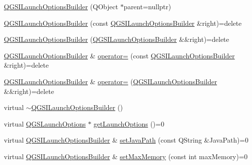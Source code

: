 \begin{DoxyCompactItemize}
\item 
\mbox{\hyperlink{class_q_g_s_i_launch_options_builder_a1f40a44ef9d9654919bdf27c4ec5d4b9}{Q\+G\+S\+I\+Launch\+Options\+Builder}} (Q\+Object $\ast$parent=nullptr)
\item 
\mbox{\hyperlink{class_q_g_s_i_launch_options_builder_a1fbedf7c9519946077a9aa386df72ea3}{Q\+G\+S\+I\+Launch\+Options\+Builder}} (const \mbox{\hyperlink{class_q_g_s_i_launch_options_builder}{Q\+G\+S\+I\+Launch\+Options\+Builder}} \&right)=delete
\item 
\mbox{\hyperlink{class_q_g_s_i_launch_options_builder_a9bb1918abccb56fdebc1c611c2323e02}{Q\+G\+S\+I\+Launch\+Options\+Builder}} (\mbox{\hyperlink{class_q_g_s_i_launch_options_builder}{Q\+G\+S\+I\+Launch\+Options\+Builder}} \&\&right)=delete
\item 
\mbox{\hyperlink{class_q_g_s_i_launch_options_builder}{Q\+G\+S\+I\+Launch\+Options\+Builder}} \& \mbox{\hyperlink{class_q_g_s_i_launch_options_builder_a71f262637f10ea70f0ccaaaafcfa65a8}{operator=}} (const \mbox{\hyperlink{class_q_g_s_i_launch_options_builder}{Q\+G\+S\+I\+Launch\+Options\+Builder}} \&right)=delete
\item 
\mbox{\hyperlink{class_q_g_s_i_launch_options_builder}{Q\+G\+S\+I\+Launch\+Options\+Builder}} \& \mbox{\hyperlink{class_q_g_s_i_launch_options_builder_a83bfe4470548c10932d5e21005b4379c}{operator=}} (\mbox{\hyperlink{class_q_g_s_i_launch_options_builder}{Q\+G\+S\+I\+Launch\+Options\+Builder}} \&\&right)=delete
\item 
virtual \mbox{\hyperlink{class_q_g_s_i_launch_options_builder_a2d32873930335fbb20288bc6a72c4dad}{$\sim$\+Q\+G\+S\+I\+Launch\+Options\+Builder}} ()
\item 
virtual \mbox{\hyperlink{class_q_g_s_launch_options}{Q\+G\+S\+Launch\+Options}} $\ast$ \mbox{\hyperlink{class_q_g_s_i_launch_options_builder_a10a7fef77cd4a56b2a9ec686d144a630}{get\+Launch\+Options}} ()=0
\item 
virtual \mbox{\hyperlink{class_q_g_s_i_launch_options_builder}{Q\+G\+S\+I\+Launch\+Options\+Builder}} \& \mbox{\hyperlink{class_q_g_s_i_launch_options_builder_a45ab3737e587d9d7e01af6f635c815b9}{set\+Java\+Path}} (const Q\+String \&Java\+Path)=0
\item 
virtual \mbox{\hyperlink{class_q_g_s_i_launch_options_builder}{Q\+G\+S\+I\+Launch\+Options\+Builder}} \& \mbox{\hyperlink{class_q_g_s_i_launch_options_builder_a58390571b351c5bc06ba9f2fad8079bc}{set\+Max\+Memory}} (const int max\+Memory)=0
\item 

\end{DoxyCompactItemize}

